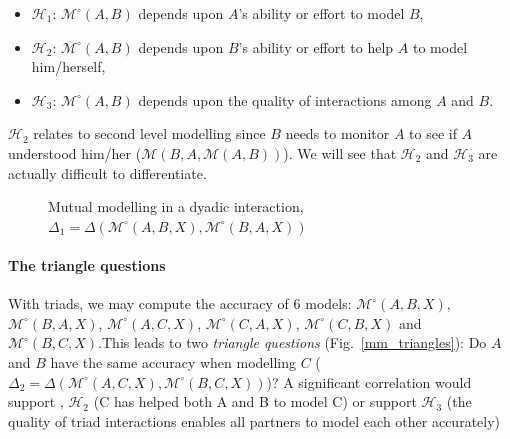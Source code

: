 \documentclass[natbib]{svjour3}
\newcommand{\Model}[3]{{$\mathcal{M}^{\circ}(#1, #2, #3)$}}
\begin{document}
\begin{itemize}
    \item $\mathcal{H}_{1}$: $\mathcal{M}^{\circ}(A,B)$ depends upon $A$'s ability or effort
        to model $B$,
    
    \item $\mathcal{H}_{2}$: $\mathcal{M}^{\circ}(A,B)$ depends upon  $B$'s ability or
        effort to help $A$ to model him/herself,

    \item $\mathcal{H}_{3}$: $\mathcal{M}^{\circ}(A,B)$ depends upon the quality of
        interactions among $A$ and $B$.

\end{itemize}


$\mathcal{H}_{2}$ relates to second level modelling since $B$ needs to monitor
$A$ to see if $A$ understood him/her ($\mathcal{M}(B,A,\mathcal{M}(A,B))$). We
will see that $\mathcal{H}_{2}$ and $\mathcal{H}_{3}$ are actually difficult to
differentiate.



\begin{figure}[htb]
\centering


\caption{\small Mutual modelling in a dyadic interaction, $\Delta_1 =
    \Delta(\mathcal{M}^{\circ} (A,B,X),
\mathcal{M}^{\circ} (B,A,X))$}

\label{mm_symmetry}
\end{figure}

\paragraph{The triangle questions}

With triads, we may compute the accuracy of 6 models: \Model{A}{B}{X},
\Model{B}{A}{X}, \Model{A}{C}{X}, \Model{C}{A}{X}, \Model{C}{B}{X} and
\Model{B}{C}{X}.This leads to two \emph{triangle questions}
(Fig.~\ref{mm_triangles}): Do $A$ and $B$ have the same accuracy when modelling
$C$ ($\Delta_2 = \Delta(\mathcal{M}^{\circ}(A,C,X),
\mathcal{M}^{\circ}(B,C,X))$)? A significant correlation would support ,
$\mathcal{H}_{2}$  (C has helped both A and B to model C) or support
$\mathcal{H}_{3}$ (the quality of triad interactions enables all partners to
model each other accurately)  
\end{document}

